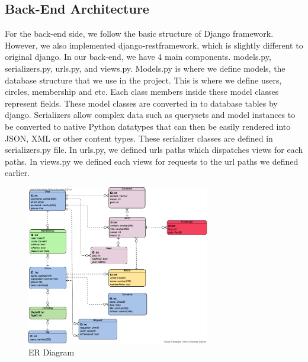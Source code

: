 \documentclass[conference]{IEEEtran}
\begin{document}
\subsection{Back-End Architecture}
For the back-end side, we follow the basic structure of Django framework. However, we also implemented django-restframework, which is slightly different to original django. In our back-end, we have 4 main components. models.py, serializers.py, urls.py, and views.py. Models.py is where we define models, the database structure that we use in the project. This is where we define users, circles, membership and etc. Each class members inside these model classes represent fields. These model classes are converted in to database tables by django. Serializers allow complex data such as querysets and model instances to be converted to native Python datatypes that can then be easily rendered into JSON, XML or other content types. These serializer classes are defined in serializers.py file. In urls.py, we defined urls paths which dispatches views for each paths. In views.py we defined each views for requests to the url paths we defined earlier. 
\begin{figure}[h]
    \centering
    \includegraphics[width=8cm]{images/erd.png}
    \caption{ER Diagram}
    \label{fig:my_label}
\end{figure}
\clearpage
\end{document}
